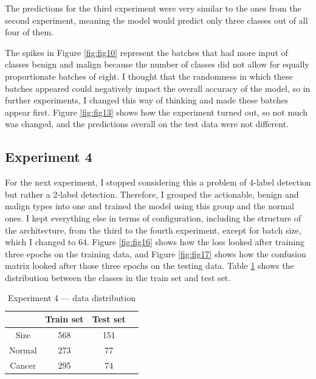 The predictions for the third experiment were very similar to the ones from the second experiment, meaning the model would predict only three classes out of all four of them.

The spikes in Figure \ref{fig:fig10} represent the batches that had more input of classes benign and malign because the number of classes did not allow for equally proportionate batches of eight. I thought that the randomness in which these batches appeared could negatively impact the overall accuracy of the model, so in further experiments, I changed this way of thinking and made these batches appear first. Figure \ref{fig:fig13} shows how the experiment turned out, so not much was changed, and the predictions overall on the test data were not different.

\subsection{Experiment 4}

For the next experiment, I stopped considering this a problem of 4-label detection but rather a 2-label detection. Therefore, I grouped the actionable, benign and malign types into one and trained the model using this group and the normal ones. I kept everything else in terms of configuration, including the structure of the architecture, from the third to the fourth experiment, except for batch size, which I changed to 64. Figure \ref{fig:fig16} shows how the loss looked after training three epochs on the training data, and Figure \ref{fig:fig17} shows how the confusion matrix looked after those three epochs on the testing data. Table \ref{tab:tab2} shows the distribution between the classes in the train set and test set.

\begin{table}[ht!]
\centering
\begin{tabular}{|c|c|c|c|}
    \hline
    & Train set & Test set \\ \hline
    Size & 568 & 151 \\ \hline
    Normal & 273 & 77\\ \hline
    Cancer & 295 & 74\\ \hline
    \end{tabular}
    \caption{Experiment 4 --- data distribution}
    \label{tab:tab2}
\end{table}

